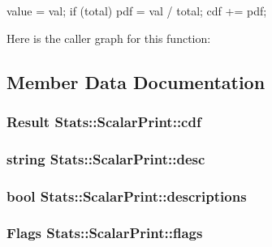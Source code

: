 \begin{DoxyCode}
{
    value = val;
    if (total) {
        pdf = val / total;
        cdf += pdf;
    }
}
\end{DoxyCode}


Here is the caller graph for this function:




\subsection{Member Data Documentation}
\hypertarget{structStats_1_1ScalarPrint_aeb6a7afaa0bf80f0d8629d9798afc2e3}{
\subsubsection[{cdf}]{\setlength{\rightskip}{0pt plus 5cm}Result {\bf Stats::ScalarPrint::cdf}}}
\label{structStats_1_1ScalarPrint_aeb6a7afaa0bf80f0d8629d9798afc2e3}
\hypertarget{structStats_1_1ScalarPrint_a7489ca369b46014bdece1ecb9b90e097}{
\subsubsection[{desc}]{\setlength{\rightskip}{0pt plus 5cm}string {\bf Stats::ScalarPrint::desc}}}
\label{structStats_1_1ScalarPrint_a7489ca369b46014bdece1ecb9b90e097}
\hypertarget{structStats_1_1ScalarPrint_a738a9523ba5234d01d11127b1dc1eb8d}{
\subsubsection[{descriptions}]{\setlength{\rightskip}{0pt plus 5cm}bool {\bf Stats::ScalarPrint::descriptions}}}
\label{structStats_1_1ScalarPrint_a738a9523ba5234d01d11127b1dc1eb8d}
\hypertarget{structStats_1_1ScalarPrint_a920e3f724dce9d9a24810a16ffacb4bb}{
\subsubsection[{flags}]{\setlength{\rightskip}{0pt plus 5cm}Flags {\bf Stats::ScalarPrint::flags}}}
